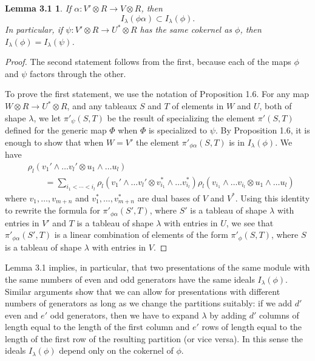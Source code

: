 \documentclass{tran-l}
\theoremstyle{plain}
\newtheorem*{theorem14}{Lemma 3.1}
\theoremstyle{remark}
\theoremstyle{definition}
\begin{document}
\begin{theorem14}
If $\alpha :V'\otimes R\rightarrow V\otimes R$, then 
\begin{equation*}I_{\lambda }(\phi \alpha )\subset I_{\lambda }(\phi ).
\end{equation*}
In particular, if
$\psi :V'\otimes R\rightarrow U^{*}\otimes R$ has the same cokernel
as $\phi $, then $I_{\lambda }(\phi )=I_{\lambda }(\psi )$.
\end{theorem14}
\begin{proof} The second statement follows from the first, because
each of the maps $\phi $ and $\psi $ factors through the other.

To prove the first statement, we use the notation of Proposition 1.6.
For any map $W\otimes R\to U^{*}\otimes R$, and any tableaux $S$ and $T$
of elements in $W$ and $U$, both of shape $\lambda $, 
we let
$\pi '_{\psi }(S,T)$ be the result of specializing the element $\pi '(S,T)$ defined
for the generic map $\Phi $ when $\Phi $ is specialized to $\psi $.
By Proposition 1.6,
it is enough to show that when $W=V'$ the element $\pi '_{\phi \alpha }(S,T)$
is in $I_{\lambda }(\phi )$. We have
\begin{align*}
&\rho _{l}(v_{1}'\wedge \dots v_{l}'\otimes u_{1}\wedge \dots u_{l})\\
&\qquad =
\sum _{i_{1}<\cdots <i_{l}}
\rho _{l}(v_{1}'\wedge \dots v_{l}'\otimes v_{i_{1}}^{*}\wedge \dots v_{i_{l}}^{*})
\rho _{l}(v_{i_{1}}\wedge \dots v_{i_{l}}\otimes u_{1}\wedge \dots u_{l})
\end{align*}
where $v_{1},\dots , v_{m+n}$ and 
$v_{1}^{*},\dots , v_{m+n}^{*}$ are dual bases of $V$ and $V^{*}$.
Using this identity to rewrite the formula for
$\pi '_{\phi \alpha }(S',T)$, 
where $S'$ is a tableau of shape $\lambda $ with entries in $V'$
and $T$ is a tableau of shape $\lambda $ with entries in $U$, we see that
$\pi '_{\phi \alpha }(S',T)$ is a linear combination of elements of the form
$\pi '_{\phi }(S,T)$, where 
$S$ is a tableau of shape $\lambda $ with entries in $V$.
\end{proof}


Lemma 3.1 implies, in particular, that two presentations of the same module
with the same numbers of even and odd generators have the same 
ideals $I_{\lambda }(\phi )$. Similar arguments show that we can allow
for presentations with different numbers of generators as long 
as we change the partitions suitably: if we add $d'$ even and $e'$ odd 
generators, then we have to expand $\lambda $ by adding $d'$ columns
of length equal to the length of the first column  and 
$e'$ rows of length equal to the length of the first row of the
resulting partition (or vice versa). In this sense 
the ideals $I_{\lambda }(\phi )$ depend only on the cokernel of 
$\phi $.
\end{document}
